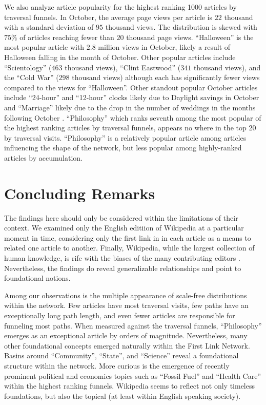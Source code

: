 \documentclass[11pt]{report}
\begin{document}
We also analyze article popularity for the highest ranking 1000 articles by 
traversal funnels. In October, the average page views per article is 
$22$ thousand with a standard deviation of $95$ thousand views. The distribution
is skewed with $75\%$ of articles reaching fewer than $20$ thousand page views. 
``Halloween'' is the most popular article with $2.8$ million views in October,
likely a result of Halloween falling in the month of October. 
Other popular articles include ``Scientology'' ($463$ thousand views), ``Clint Eastwood'' 
($341$ thousand views),
and the ``Cold War'' ($298$ thousand views) although each has significantly fewer views compared to the views for ``Halloween''.
Other standout popular October articles include ``24-hour'' and ``12-hour'' clocks likely due
to Daylight savings in October and ``Marriage'' likely due to the drop in the number of
weddings in the months following October
\cite{weddings}.
``Philosophy'' which ranks seventh among the most popular of the highest ranking articles by traversal funnels, appears no where in the top 20
by traversal visits. ``Philosophy'' is a relatively popular article 
among articles influencing the shape of the network, but less popular among 
highly-ranked articles by accumulation.






\section{Concluding Remarks}

The findings here should only be considered within the limitations of their context.
We examined only the English editiion of Wikipedia at a particular moment in time, 
considering only the first link in in each article as a means to related one article to another.
Finally, Wikipedia, while the largest 
collection of human knowledge, is rife with the biases of the many contributing editors
\cite{bias}
. Nevertheless, the findings do reveal
generalizable relationships and point to foundational notions.


Among our observations is the multiple appearance of scale-free distributions within the network. 
Few articles have most traversal visits, few paths have an exceptionally long path length, and even fewer
articles are responsible for funneling most paths. When measured against the traversal funnels, 
``Philosophy'' emerges as an exceptional article by orders of magnitude. 
Nevertheless, many other foundational concepts emerged naturally within the First Link Network. 
Basins around ``Community'', ``State'', and ``Science'' reveal a foundational structure within the network. 
More curious is the emergence of recently prominent political and economics topics such as ``Fossil Fuel'' and ``Health Care'' 
within the highest ranking funnels. 
Wikipedia seems to reflect not only timeless foundations, but also the topical (at least within English speaking society).
\end{document}
